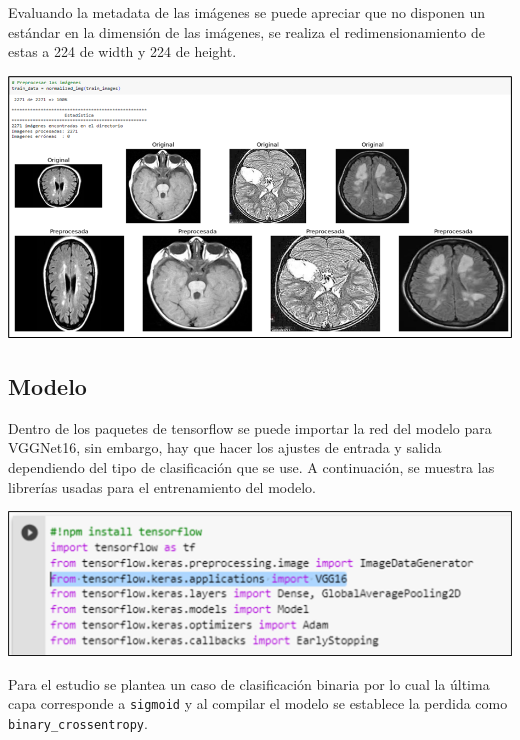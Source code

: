 \documentclass[12pt,twoside,titlepage]{ingenius}
\newenvironment{figura}
  {\par\bigskip\noindent\minipage{\linewidth}}
  {\endminipage\par\bigskip}
\begin{document}
\begin{multicols}{2}
Evaluando la metadata de las imágenes se puede apreciar que no disponen un estándar en la dimensión de las imágenes, se realiza el redimensionamiento de estas a 224 de width y 224 de height.

\begin{figura}%
	\centering
	\includegraphics[scale=0.3]{figuras/fig2.png}
	\label{figura2}
\end{figura}

\subsection{Modelo}
Dentro de los paquetes de tensorflow se puede importar la red del modelo para VGGNet16, sin embargo, hay que hacer los ajustes de entrada y salida dependiendo del tipo de clasificación que se use. 
A continuación, se muestra las librerías usadas para el entrenamiento del modelo.

\begin{figura}%
	\centering
	\includegraphics[scale=0.24]{figuras/fig3.png}
	\label{figura3}
\end{figura}

Para el estudio se plantea un caso de clasificación binaria por lo cual la última capa corresponde a \texttt{sigmoid} y al compilar el modelo se establece la perdida como \texttt{binary\_crossentropy}.


\end{multicols}
\end{document}
